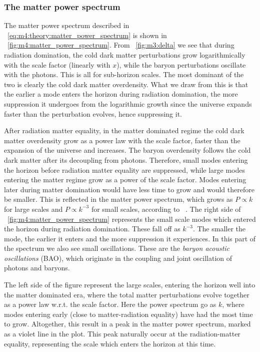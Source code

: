     \subsubsection{The matter power spectrum}
        The matter power spectrum described in ~\cref{eq:m4:theory:matter_power_spectrum} is shown in ~\cref{fig:m4:matter_power_spectrum}. From ~\cref{fig:m3:delta} we see that during radiation domination, the cold dark matter perturbations grow logarithmically with the scale factor (linearly with $x$), while the baryon perturbations oscillate with the photons. This is all for sub-horizon scales. The most dominant of the two is clearly the cold dark matter overdensity. What we draw from this is that the earlier a mode enters the horizon during radiation domination, the more suppression it undergoes from the logarithmic growth since the universe expands faster than the perturbation evolves, hence suppressing it. 

        After radiation matter equality, in the matter dominated regime the cold dark matter overdensity grow as a power law with the scale factor, faster than the expansion of the universe and increases. The baryon overdensity follows the cold dark matter after its decoupling from photons. Therefore, small modes entering the horizon before radiation matter equality are suppressed, while large modes entering the matter regime grow as a power of the scale factor. Modes entering later during matter domination would have less time to grow and would therefore be smaller.  This is reflected in the matter power spectrum, which grows as $P\propto k$ for large scales and $P\propto k^{-3}$ for small scales, according to ~\cite{dodelson2020modern}. The right side of ~\cref{fig:m4:matter_power_spectrum} represents the small scale modes which entered the horizon during radiation domination. These fall off as $k^{-3}$. The smaller the mode, the earlier it enters and the more suppression it experiences. In this part of the spectrum we also see small oscillations. These are the \textit{baryon acoustic oscillations} (BAO), which originate in the coupling and joint oscillation of photons and baryons. 
        
        The left side of the figure represent the large scales, entering the horizon well into the matter dominated era, where the total matter perturbations evolve together as a power law w.r.t. the scale factor. Here the power spectrum go as $k$, where modes entering early (close to matter-radiation equality) have had the most time to grow. Altogether, this result in a peak in the matter power spectrum, marked as a violet line in the plot. This peak naturally occur at the radiation-matter equality, representing the scale which enters the horizon at this time. 

